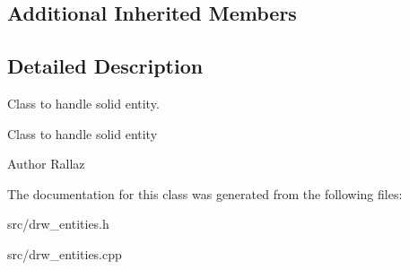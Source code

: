 \subsection*{Additional Inherited Members}


\subsection{Detailed Description}
Class to handle solid entity. 

Class to handle solid entity \begin{DoxyAuthor}{Author}
Rallaz 
\end{DoxyAuthor}


The documentation for this class was generated from the following files\+:\begin{DoxyCompactItemize}
\item 
src/drw\+\_\+entities.\+h\item 
src/drw\+\_\+entities.\+cpp\end{DoxyCompactItemize}
